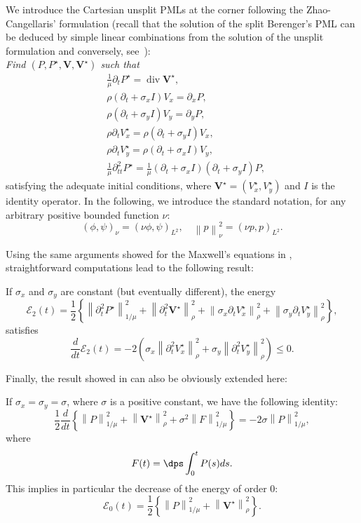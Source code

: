 \documentclass[a4paper]{article}
\def\div{\mathop{\mathrm{div}}\nolimits}
\def\bV{\boldsymbol{V}}
\def\bVs{\boldsymbol{V}^{\star}}
\def\Vs{V^{\star}}
\def\Ps{P^{\star}}
\begin{document}
We introduce the Cartesian unsplit PMLs at the corner following the 
Zhao-Cangellaris' formulation \cite{ZC} (recall that the solution of 
the split Berenger's PML can be deduced by simple linear combinations 
from the solution of the unsplit %
formulation and conversely, 
see~\cite{BJ:02}):~\\
{\it Find $(P,\Ps,\bV,\bVs)$ such that}
\begin{align}
&\frac{1}{\mu}\partial_{t}\Ps=\div \bVs,\label{eq:pml-sys_1}\\
&\rho\left(\partial_{t}+\sigma_{x}I\right)V_{x}=\partial_{x}P,\\
&\rho\left(\partial_{t}+\sigma_{y}I\right)V_{y}=\partial_{y}P,\\
&\rho\partial_{t}\Vs_{x}=\rho\left(\partial_{t}+\sigma_{y}I\right)V_{x},\\
&\rho\partial_{t}\Vs_{y}=\rho\left(\partial_{t}+\sigma_{x}I\right)V_{y},\\
&\frac{1}{\mu}\partial_{tt}^{2}\Ps=
\frac{1}{\mu}\left(\partial_{t}+\sigma_{x}I\right)\left(\partial_{t}+\sigma_{y}I\right)P,\label{eq:pml-sys_6}
\end{align}
satisfying the adequate initial conditions, where 
$\bVs=(\Vs_{x},\Vs_{y})$ and $I$ is the identity operator. In the
following, we introduce the standard notation, for any arbitrary positive bounded
function $\nu$:
\[
(\phi,\psi)_{\nu}= (\nu \phi,\psi)_{L^2}, \quad 
\left\| p \right\|^2_{\nu} = (\nu p,p)_{L^2}.
\]

Using the same arguments showed for the Maxwell's equations in \cite{BJ:02}, 
straightforward computations lead to the following result:
\begin{theo}
If $\sigma_{x}$ and $\sigma_{y}$ are constant (but eventually different), the energy
\begin{equation*}
\mathcal{E}_2(t)=\frac12 \left\{ \left\|  \partial^{2}_{t}\Ps\right\|^2_{1/\mu} 
+ \left\| \partial^{2}_{t}\bVs \right\|^2_{\rho}
+ \left\| \sigma_{x} \partial_{t}  \Vs_{x}  \right\|^2_{\rho} 
+ \left\| \sigma_{y} \partial_{t}  \Vs_{y}  \right\|^2_{\rho} 
\right\},
\end{equation*}
satisfies
$$
\frac{d}{dt}\mathcal{E}_2(t)=-2\left(\sigma_{x} \left\|
    \partial_{t}^{2}\Vs_{x}\right\|^2_{\rho}
+ \sigma_{y} \left\|\partial_{t}^{2}\Vs_{y}\right\|^2_{\rho}\right)\le 0.
$$
\end{theo}

Finally, the result showed in \cite{BPG:04} can also be obviously extended
here:
\begin{theo}
If $\sigma_{x}= \sigma_{y}= \sigma $, where $\sigma$ is a positive
constant, we have the following identity:
\[
\frac12 \frac{d}{dt} \left\{ \left\| P  \right\|^2_{1/\mu}  +  \left\|
    \bVs\right\|^2_{\rho} + \sigma^2  \left\| F  \right\|^2_{1/\mu}
    \right\} = -2 \sigma \left\| P  \right\|^2_{1/\mu}, 
\]
where 
\[
F(t)= \dps \int_0^t P(s) ds.
\]
This implies in particular the decrease of 
the energy of order 0: 
\begin{equation*}
\mathcal{E}_0(t)=\frac12\left\{\left\| P  \right\|^2_{1/\mu}  +  \left\|
    \bVs\right\|^2_{\rho} \right\}.
\end{equation*}
\end{theo}
\end{document}

